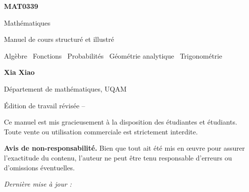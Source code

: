 
\color{ink}
\frontmatter

\begin{titlepage}
\centering
\vspace*{2.2cm}
{\Huge\sffamily\bfseries\color{navy} MAT0339\par}
\vspace{0.35cm}
{\LARGE\sffamily\color{ink} Mathématiques\par}
\vspace{0.8cm}
{\large\sffamily\color{teal} Manuel de cours structuré et illustré\par}
\vspace{0.35cm}
{\normalsize Algèbre \textbullet\ Fonctions \textbullet\ Probabilités \textbullet\ Géométrie analytique \textbullet\ Trigonométrie\par}
\vspace{1.5cm}
\vfill
{\Large\sffamily\bfseries\color{navy} Xia Xiao\par}
\vspace{0.25cm}
{\large\sffamily\color{slate} Département de mathématiques, UQAM\par}
\vspace{0.8cm}
{\large\sffamily\color{teal} Édition de travail révisée -- \EditionDate{}\par}
\end{titlepage}

\thispagestyle{empty}
\vspace*{\fill}
\begin{center}
Ce manuel est mis gracieusement à la disposition des étudiantes et étudiants.\\
Toute vente ou utilisation commerciale est strictement interdite.
\end{center}
\vspace{0.6cm}
\textbf{Avis de non-responsabilité.} Bien que tout ait été mis en œuvre pour assurer l'exactitude du contenu, l'auteur ne peut être tenu responsable d'erreurs ou d'omissions éventuelles.
\vspace{0.6cm}
\begin{center}\textit{Dernière mise à jour : \EditionDate{}}\end{center}
\vspace*{\fill}
\clearpage

